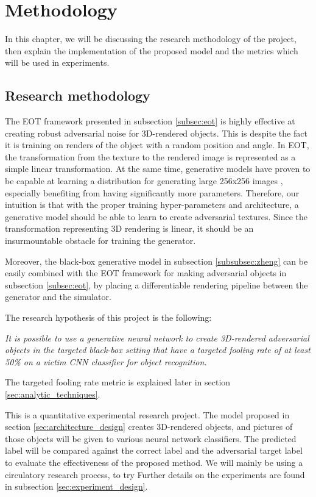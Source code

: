 \chapter{Methodology}
    \label{chap:methodology}
    
In this chapter, we will be discussing the research methodology of the project, then explain the implementation of the proposed model and the metrics which will be used in experiments.
    
\section{Research methodology}

The EOT framework presented in subsection \ref{subsec:eot} is highly effective at creating robust adversarial noise for 3D-rendered objects. This is despite the fact it is training on renders of the object with a random position and angle. In EOT, the transformation from the texture to the rendered image is represented as a simple linear transformation. At the same time, generative models have proven to be capable at learning a distribution for generating large 256x256 images \cite{big_gan}, especially benefiting from having significantly more parameters. Therefore, our intuition is that with the proper training hyper-parameters and architecture, a generative model should be able to learn to create adversarial textures. Since the transformation representing 3D rendering is linear, it should be an insurmountable obstacle for training the generator.

Moreover, the black-box generative model in subsection \ref{subsubsec:zheng} can be easily combined with the EOT framework for making adversarial objects in subsection \ref{subsec:eot}, by placing a differentiable rendering pipeline between the generator and the simulator.

The research hypothesis of this project is the following: 

\textit{It is possible to use a generative neural network to create 3D-rendered adversarial objects in the targeted black-box setting that have a targeted fooling rate of at least 50\% on a victim CNN classifier for object recognition.}

\bigbreak
The targeted fooling rate metric is explained later in section \ref{sec:analytic_techniques}.

This is a quantitative experimental research project. The model proposed in section \ref{sec:architecture_design} creates 3D-rendered objects, and pictures of those objects will be given to various neural network classifiers. The predicted label will be compared against the correct label and the adversarial target label to evaluate the effectiveness of the proposed method. We will mainly be using a circulatory research process, to try Further details on the experiments are found in subsection \ref{sec:experiment_design}.

